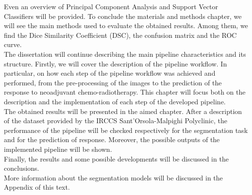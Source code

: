 \documentclass{standalone}
\begin{document}
Even an overview of Principal Component Analysis and Support Vector Classifiers will be provided.
To conclude the materials and methods chapter, we will see the main methods used to evaluate the obtained results.
Among them, we find the Dice Similarity Coefficient (DSC), the confusion matrix and the ROC curve.
\\
The dissertation will continue describing the main pipeline characteristics and its structure.
Firstly, we will cover the description of the pipeline workflow.
In particular, on how each step of the pipeline workflow was achieved and performed, from the pre-processing of the images to the prediction of the response to neoadjuvant chemo-radiotherapy.
This chapter will focus both on the description and the implementation of each step of the developed pipeline.
\\
The obtained results will be presented in the aimed chapter.
After a description of the dataset provided by the IRCCS Sant’Orsola-Malpighi Polyclinic, the performance of the pipeline will be checked respectively for the segmentation task and for the prediction of response.
Moreover, the possible outputs of the implemented pipeline will be shown.
\\
Finally, the results and some possible developments will be discussed in the conclusions.
\\
More information about the segmentation models will be discussed in the Appendix of this text.
\end{document}
